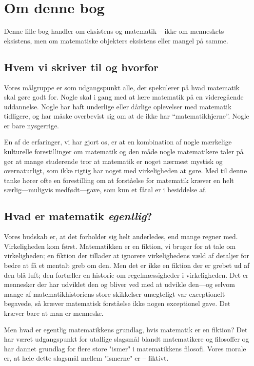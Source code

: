 \chapter{Om denne bog}

Denne lille bog handler om eksistens og matematik -- ikke om menneskets eksistens, men om matematiske objekters eksistens eller mangel på samme.

\section{Hvem vi skriver til og hvorfor}

Vores målgruppe er som udgangspunkt alle, der spekulerer på hvad matematik skal gøre godt for. Nogle skal i gang med at lære matematik på en videregående uddannelse. Nogle har haft underlige eller dårlige oplevelser med matematik tidligere, og har måske overbevist sig om at de ikke har ``matematikhjerne''. Nogle er bare nysgerrige.

En af de erfaringer, vi har gjort os, er at en kombination af nogle mærkelige kulturelle forestillinger om matematik og den måde nogle matematikere taler på gør at mange studerende tror at matematik er noget nærmest mystisk og overnaturligt, som ikke rigtig har noget med virkeligheden at gøre. Med til denne tanke hører ofte en forestilling om at forståelse for matematik kræver en helt særlig---muligvis medfødt---gave, som kun et fåtal er i besiddelse af.

\section{Hvad er matematik \emph{egentlig}?}

Vores budskab er, at det forholder sig helt anderledes, end mange regner med. Virkeligheden kom først. Matematikken er en fiktion, vi bruger for at tale om virkeligheden; en fiktion der tillader at ignorere virkelighedens væld af detaljer for bedre at få et mentalt greb om den. Men det er ikke en fiktion der er grebet ud af den blå luft; den fortæller en historie om regelmæssigheder i virkeligheden. Det er mennesker der har udviklet den og bliver ved med at udvikle den---og selvom mange af matematikhistoriens store skikkelser unægteligt var exceptionelt begavede, så kræver matematisk forståelse ikke nogen exceptionel gave. Det kræver bare at man er menneske.

Men hvad er egentlig matematikkens grundlag, hvis matematik er en fiktion? Det har været udgangspunkt for utallige slagsmål blandt matematikere og filosoffer og har dannet grundlag for flere store "ismer" i matematikkens filosofi. Vores morale er, at hele dette slagsmål mellem "ismerne" er -- fiktivt.

